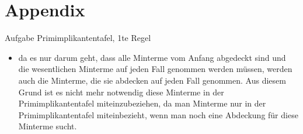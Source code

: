 
\section{Appendix}

\setcounter{exercise}{1}

\begin{frame}[allowframebreaks]{Aufgabe \thesection}{Primimplikantentafel, 1te Regel}
  \begin{itemize}
    \item da es nur darum geht, dass alle Minterme vom Anfang abgedeckt sind und die wesentlichen Minterme auf jeden Fall genommen werden müssen, werden auch die Minterme, die sie abdecken auf jeden Fall genommen. Aus diesem Grund ist es nicht mehr notwendig diese Minterme in der Primimplikantentafel miteinzubeziehen, da man Minterme nur in der Primimplikantentafel miteinbezieht, wenn man noch eine Abdeckung für diese Minterme sucht.
  \end{itemize}
\end{frame}

